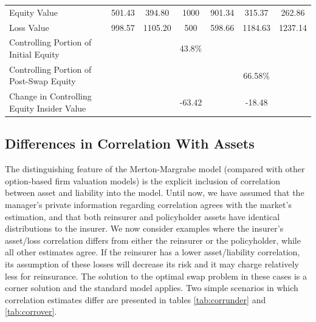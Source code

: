 \begin{table}
\begin{center}
\begin{tabular}{p{2in}cccccc}
\midrule

Equity Value & 501.43 &    394.80 &       1000 &   901.34 &   315.37 &   262.86 \\ 

Loss Value & 998.57 &   1105.20 &        500 &   598.66 &   1184.63 &   1237.14 \\ 

\midrule

Controlling Portion of Initial Equity &            &            &   43.8\% &            &            &            \\ 

Controlling Portion of Post-Swap Equity &            &            &            &            &   66.58\% &            \\ 

\midrule

Change in Controlling Equity Insider Value &            &            &   -63.42 &            &   -18.48 &            \\ 

\bottomrule

\end{tabular}  
\end{center}
\end{table}

\subsection{Differences in Correlation With Assets}

The distinguishing feature of the Merton-Margrabe model (compared with other option-based firm valuation models) is the explicit inclusion of correlation between asset and liability into the model.  Until now, we have assumed that the manager's private information regarding correlation agrees with the market's estimation, and that both reinsurer and policyholder assets have identical distributions to the insurer.  We now consider examples where the insurer's asset/loss correlation differs from either the reinsurer or the policyholder, while all other estimates agree.  If the reinsurer has a lower asset/liability correlation, its assumption of these losses will decrease its risk and it may charge relatively less for reinsurance.  The solution to the optimal swap problem in these cases is a corner solution and the standard model applies.  Two simple scenarios in which correlation estimates differ are presented in tables \ref{tab:corrunder} and \ref{tab:corrover}.

